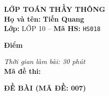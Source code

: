 \noindent
\begin{tcolorbox}[colback=white,colframe=black,arc=0mm,boxrule=0.8pt,top=4pt,bottom=4pt,left=6pt,right=6pt]
	\begin{minipage}[c]{0.44\textwidth}
		{\bfseries\large LỚP TOÁN THẦY THÔNG}\\[3pt]
		\textbf{Họ và tên:} \textbf{\large Tiến Quang}\\[3pt]
		\textbf{Lớp:} LỚP 10 \quad -- \quad \textbf{Mã HS:} \texttt{HS018}
	\end{minipage}
	\hfill
	\begin{minipage}[c]{0.22\textwidth}
		\begin{tcolorbox}[colback=white,colframe=black,arc=0mm,boxrule=0.6pt,height=1.8cm,halign=center,valign=top,top=2pt]
			{\bfseries\normalsize Điểm}
		\end{tcolorbox}
	\end{minipage}
	\hfill
	\begin{minipage}[c]{0.30\textwidth}
		\raggedleft
		\textit{Thời gian làm bài: 30 phút}\\[4pt]
		\textbf{Mã đề thi:} 
	\end{minipage}
\end{tcolorbox}
\vspace{0.25cm}

\noindent\textbf{\large ĐỀ BÀI (MÃ ĐỀ: 007)}
\vspace{0.1cm}

